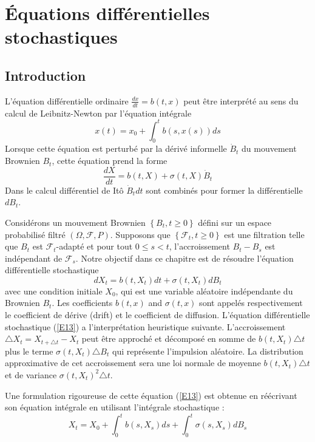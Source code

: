 \documentclass[A4paper,12pt]{report}
\begin{document}
\chapter{Équations différentielles stochastiques}
\section{Introduction}
L'équation différentielle ordinaire $\frac{d x}{d t}=b(t, x)$ peut être interprété au sens du calcul de Leibnitz-Newton par l'équation intégrale
$$x(t)=x_{0}+\int_{0}^{t} b(s, x(s)) d s$$
Lorsque cette équation est perturbé par la dérivé informelle $\dot{B}_{t}$ du mouvement Brownien $B_{t}$, cette équation prend la forme
$$
\frac{d X}{d t}=b(t, X)+\sigma(t, X) \dot{B}_{t}
$$
Dans le calcul différentiel de Itô $\dot{B}_{t} d t$ sont combinés pour former la différentielle $d B_{t}$.

Considérons un mouvement Brownien $\left\{B_{t}, t \geq 0\right\}$ défini sur un espace probabilisé filtré $(\Omega, \mathcal{F}, P)$. Supposons que $\left\{\mathcal{F}_{t}, t \geq 0\right\}$ est une filtration telle que $B_{t}$ est $\mathcal{F}_{t}$-adapté et pour tout $0 \leq s<t$, l'accroissement $B_{t}-B_{s}$ est indépendant de $\mathcal{F}_{s}$. Notre objectif dans ce chapitre est de résoudre l'équation différentielle stochastique
\begin{equation}\label{E13}
d X_{t}=b\left(t, X_{t}\right) d t+\sigma\left(t, X_{t}\right) d B_{t}
\end{equation}
avec une condition initiale $X_{0}$, qui est une variable aléatoire indépendante du Brownien $B_{t}$.
Les coefficients $b(t, x)$ and $\sigma(t, x)$ sont appelés respectivement le coefficient de dérive (drift) et le coefficient de diffusion. 
L'équation différentielle stochastique (\ref{E13}) a l'interprétation heuristique suivante.
L'accroissement $\triangle X_{t}=X_{t+\triangle t}-X_{t}$ peut être approché et décomposé en somme de $b\left(t, X_{t}\right) \triangle t$ plus le terme $\sigma\left(t, X_{t}\right) \triangle B_{t}$ qui représente l'impulsion aléatoire. La distribution approximative de cet accroissement sera une loi normale de moyenne $b\left(t, X_{t}\right) \triangle t$ et de variance $\sigma\left(t, X_{t}\right)^{2} \triangle t$.

Une formulation rigoureuse de cette équation (\ref{E13}) est obtenue en réécrivant son équation intégrale en utilisant l'intégrale stochastique :
\begin{equation}
X_{t}=X_{0}+\int_{0}^{t} b\left(s, X_{s}\right) d s+\int_{0}^{t} \sigma\left(s, X_{s}\right) d B_{s} 
\end{equation}
\end{document}
